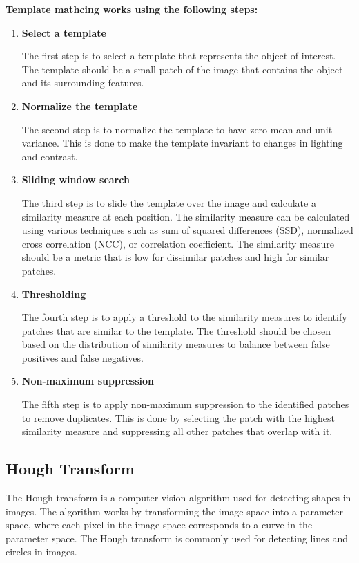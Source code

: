     \textbf{Template mathcing works using the following steps:}
        \begin{enumerate}

            \item \textbf{Select a template}

            The first step is to select a template that represents the object of interest. 
            The template should be a small patch of the image that contains the object and its surrounding features.

            \item \textbf{Normalize the template}

            The second step is to normalize the template to have zero mean and unit variance. 
            This is done to make the template invariant to changes in lighting and contrast.

            \item \textbf{Sliding window search}

            The third step is to slide the template over the image and calculate a similarity measure at each position. 
            The similarity measure can be calculated using various techniques such as sum of squared differences (SSD), normalized cross correlation (NCC), or correlation coefficient. 
            The similarity measure should be a metric that is low for dissimilar patches and high for similar patches.

            \item \textbf{Thresholding}

            The fourth step is to apply a threshold to the similarity measures to identify patches that are similar to the template. 
            The threshold should be chosen based on the distribution of similarity measures to balance between false positives and false negatives. 

            \item \textbf{Non-maximum suppression}
            
            The fifth step is to apply non-maximum suppression to the identified patches to remove duplicates. 
            This is done by selecting the patch with the highest similarity measure and suppressing all other patches that overlap with it.

        \end{enumerate}

    \subsection{Hough Transform}
    The Hough transform is a computer vision algorithm used for detecting shapes in images.  
    The algorithm works by transforming the image space into a parameter space, where each pixel in the image space corresponds to a curve in the parameter space. 
    The Hough transform is commonly used for detecting lines and circles in images.
    
